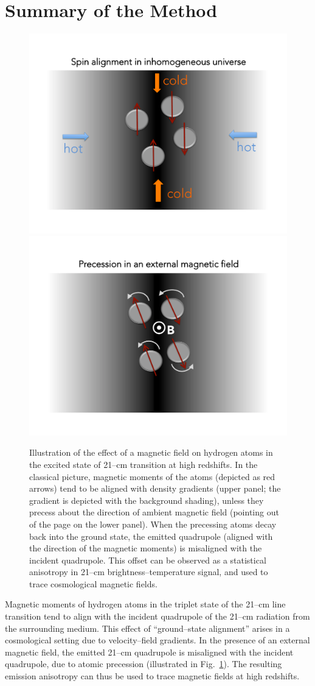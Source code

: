 \section{Summary of the Method}
\label{sec:method}
\begin{figure}
\centering
\includegraphics[width=.35\textwidth,keepaspectratio=true]{Slide2.pdf}
\includegraphics[width=.35\textwidth,keepaspectratio=true]{Slide3.pdf}
\caption{Illustration of the effect of a magnetic field on hydrogen atoms in the excited state of 21--cm transition at high redshifts. In the classical picture, magnetic moments of the atoms (depicted as red arrows) tend to be aligned with density gradients (upper panel; the gradient is depicted with the background shading), unless they precess about the direction of ambient magnetic field (pointing out of the page on the lower panel). When the precessing atoms decay back into the ground state, the emitted quadrupole (aligned with the direction of the magnetic moments) is misaligned with the incident quadrupole. This offset can be observed as a statistical anisotropy in 21--cm brightness--temperature signal, and used to trace cosmological magnetic fields.\label{fig:precession}}
\end{figure}
Magnetic moments of hydrogen atoms in the triplet state of the 21--cm line transition tend to align with the incident quadrupole of the 21--cm radiation from the surrounding medium. This effect of ``ground--state alignment'' \cite{Yan08,Yan12} arises in a cosmological setting due to velocity--field gradients. In the presence of an external magnetic field, the emitted 21--cm quadrupole is misaligned with the incident quadrupole, due to atomic precession (illustrated in Fig.~\ref{fig:precession}). The resulting emission anisotropy can thus be used to trace magnetic fields at high redshifts.

